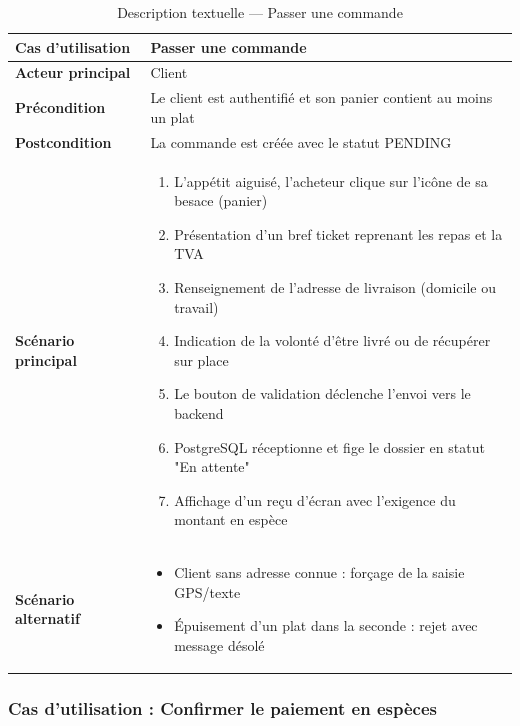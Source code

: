 \begin{table}[H]
    \centering
    \caption{Description textuelle --- Passer une commande}
    \label{tab:desc_passer_commande}
    \renewcommand{\arraystretch}{1.3}
    \begin{tabular}{|p{4cm}|p{8.5cm}|}
        \hline
        \textbf{Cas d'utilisation} & Passer une commande \\
        \hline
        \textbf{Acteur principal} & Client \\
        \hline
        \textbf{Précondition} & Le client est authentifié et son panier contient au moins un plat \\
        \hline
        \textbf{Postcondition} & La commande est créée avec le statut PENDING \\
        \hline
        \textbf{Scénario principal} &
        \begin{enumerate}
            \item L'appétit aiguisé, l'acheteur clique sur l'icône de sa besace (panier)
            \item Présentation d'un bref ticket reprenant les repas et la TVA
            \item Renseignement de l'adresse de livraison (domicile ou travail)
            \item Indication de la volonté d'être livré ou de récupérer sur place
            \item Le bouton de validation déclenche l'envoi vers le backend
            \item PostgreSQL réceptionne et fige le dossier en statut "En attente"
            \item Affichage d'un reçu d'écran avec l'exigence du montant en espèce
        \end{enumerate} \\
        \hline
        \textbf{Scénario alternatif} &
        \begin{itemize}
            \item[3a.] Client sans adresse connue : forçage de la saisie GPS/texte
            \item[5a.] Épuisement d'un plat dans la seconde : rejet avec message désolé
        \end{itemize} \\
        \hline
    \end{tabular}
\end{table}

\subsubsection{Cas d'utilisation : Confirmer le paiement en espèces}

